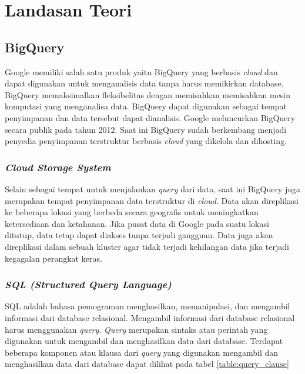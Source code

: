 \chapter{Landasan Teori}
\label{chap:teori}

\section{BigQuery\cite{bqa, bqIntroduction}}
Google memiliki salah satu produk yaitu BigQuery yang berbasis \textit{cloud} dan dapat digunakan untuk menganalisis data tanpa harus memikirkan database. BigQuery memaksimalkan fleksibelitas dengan memisahkan memisahkan mesin komputasi yang menganalisa data. BigQuery dapat digunakan sebagai tempat penyimpanan dan data tersebut dapat dianalisis. Google meluncurkan BigQuery secara publik pada tahun 2012. Saat ini BigQuery sudah berkembang menjadi penyedia penyimpanan terstruktur berbasis \textit{cloud} yang dikelola dan dihosting. 

\subsection{\textit{Cloud Storage System}}
Selain sebagai tempat untuk menjalankan \textit{query} dari data, saat ini BigQuery juga merupakan tempat penyimpanan data terstruktur di \textit{cloud}. Data akan direplikasi ke beberapa lokasi yang berbeda secara geografis untuk meningkatkan ketersediaan dan ketahanan. Jika pusat data di Google pada suatu lokasi ditutup, data tetap dapat diakses tanpa terjadi gangguan. Data juga akan direplikasi dalam sebuah kluster agar tidak terjadi kehilangan data jika terjadi kegagalan perangkat keras. 

\subsection{\textit{SQL (Structured Query Language) \cite{book:22611}}}
SQL adalah bahasa pemograman menghasilkan, memanipulasi, dan mengambil informasi dari database relasional. Mengambil informasi dari database relasional harus menggunakan \textit{query}. \textit{Query} merupakan sintaks atau perintah yang digunakan untuk mengambil dan menghasilkan data dari database. Terdapat beberapa komponen atau klausa dari \textit{query} yang digunakan mengambil dan menghasilkan data dari database dapat dilihat pada tabel \ref{table:query_clause}

